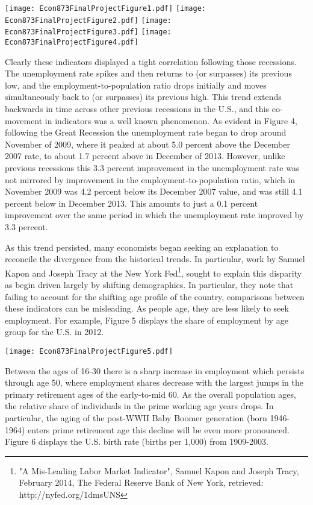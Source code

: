 \documentclass[11pt]{article}
\theoremstyle{definition}
\begin{document}
\begin{center}
\texttt{[image: Econ873FinalProjectFigure1.pdf]}
\texttt{[image: Econ873FinalProjectFigure2.pdf]}
\texttt{[image: Econ873FinalProjectFigure3.pdf]}
\texttt{[image: Econ873FinalProjectFigure4.pdf]}
\end{center}

Clearly these indicators displayed a tight correlation following those recessions.  The unemployment rate spikes and then returns to (or surpasses) its previous low, and the employment-to-population ratio drops initially and moves simultaneously back to (or surpasses) its previous high.  This trend extends backwards in time across other previous recessions in the U.S., and this co-movement in indicators was a well known phenomenon.  As evident in Figure 4, following the Great Recession the unemployment rate began to drop around November of 2009, where it peaked at about 5.0 percent above the December 2007 rate, to about 1.7 percent above in December of 2013.  However, unlike previous recessions this 3.3 percent improvement in the unemployment rate was not mirrored by improvement in the employment-to-population ratio, which in November 2009 was 4.2 percent below its December 2007 value, and was still 4.1 percent below in December 2013.  This amounts to just a 0.1 percent improvement over the same period in which the unemployment rate improved by 3.3 percent.  

As this trend persisted, many economists began seeking an explanation to reconcile the divergence from the historical trends.  In particular, work by Samuel Kapon and Joseph Tracy at the New York Fed\footnote{"A Mis-Leading Labor Market Indicator", Samuel Kapon and Joseph Tracy, February 2014, The Federal Reserve Bank of New York, retrieved: http://nyfed.org/1dmsUNS}, sought to explain this disparity as begin driven largely by shifting demographics.  In particular, they note that failing to account for the shifting age profile of the country, comparisons between these indicators can be misleading.  As people age, they are less likely to seek employment.  For example, Figure 5 displays the share of employment by age group for the U.S. in 2012.

\begin{center}
\texttt{[image: Econ873FinalProjectFigure5.pdf]}
\end{center}

Between the ages of 16-30 there is a sharp increase in employment which persists through age 50, where employment shares decrease with the largest jumps in the primary retirement ages of the early-to-mid 60.  As the overall population ages, the relative share of individuals in the prime working age years drops.  In particular, the aging of the post-WWII Baby Boomer generation (born 1946-1964) enters prime retirement age this decline will be even more pronounced.  Figure 6 displays the U.S. birth rate (births per 1,000) from 1909-2003.  
\end{document}
